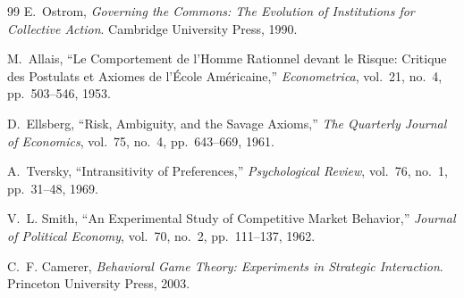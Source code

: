 \documentclass[12pt]{article}
\theoremstyle{definition}
\theoremstyle{remark}
\begin{document}
\begin{thebibliography}{99}
E.~Ostrom, \emph{Governing the Commons: The Evolution of Institutions for Collective Action}. Cambridge University Press, 1990.

M.~Allais, ``Le Comportement de l'Homme Rationnel devant le Risque: Critique des Postulats et Axiomes de l'\'{E}cole Am\'{e}ricaine,'' \emph{Econometrica}, vol.~21, no.~4, pp.~503--546, 1953.

D.~Ellsberg, ``Risk, Ambiguity, and the Savage Axioms,'' \emph{The Quarterly Journal of Economics}, vol.~75, no.~4, pp.~643--669, 1961.

A.~Tversky, ``Intransitivity of Preferences,'' \emph{Psychological Review}, vol.~76, no.~1, pp.~31--48, 1969.

V.~L. Smith, ``An Experimental Study of Competitive Market Behavior,'' \emph{Journal of Political Economy}, vol.~70, no.~2, pp.~111--137, 1962.

C.~F. Camerer, \emph{Behavioral Game Theory: Experiments in Strategic Interaction}. Princeton University Press, 2003.

\end{thebibliography}
\end{document}
